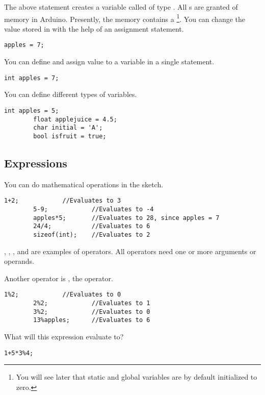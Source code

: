 \documentclass{article}
\begin{document}
		The above statement creates a variable called  of type . All s are granted  of memory in Arduino. Presently, the memory contains a \footnote{You will see later that static and global variables are by default initialized to zero.}. You can change the value stored in  with the help of an assignment statement.

		\begin{lstlisting}[gobble=8]
		apples = 7;
		\end{lstlisting}

		You can define and assign value to a variable in a single statement.

		\begin{lstlisting}[gobble=8]
		int apples = 7;
		\end{lstlisting}

		You can define different types of variables.

		\begin{lstlisting}[gobble=8]
		int apples = 5;
		float applejuice = 4.5;
		char initial = 'A';
		bool isfruit = true;
		\end{lstlisting}

	\subsection{Expressions}

		You can do mathematical operations in the sketch.

		\begin{lstlisting}[gobble=8]
		1+2;			//Evaluates to 3
		5-9;			//Evaluates to -4
		apples*5;		//Evaluates to 28, since apples = 7
		24/4;			//Evaluates to 6
		sizeof(int);	//Evaluates to 2
		\end{lstlisting}

		\inlncd{+}, \inlncd{-}, \inlncd{*}, \inlncd{/} and  are examples of operators. All operators need one or more arguments or operands.

		Another operator is \inlncd{\%}, the  operator.

		\begin{lstlisting}[gobble=8]
		1%2;			//Evaluates to 0
		2%2;			//Evaluates to 1
		3%2;			//Evaluates to 0
		13%apples;		//Evaluates to 6
		\end{lstlisting}

		What will this expression evaluate to?

		\begin{lstlisting}[gobble=8]
		1+5*3%4;
		\end{lstlisting}
\end{document}
